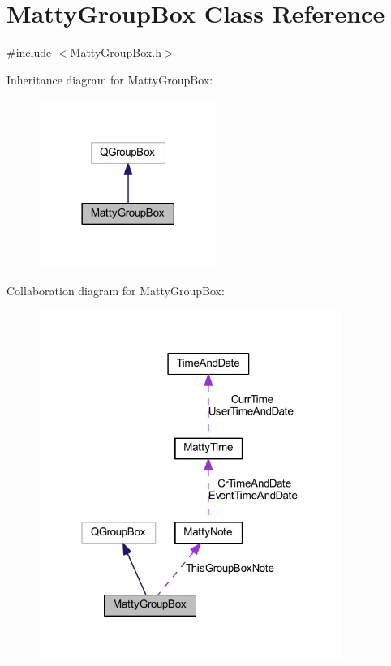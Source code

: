 \hypertarget{classMattyGroupBox}{}\section{Matty\+Group\+Box Class Reference}
\label{classMattyGroupBox}


{\ttfamily \#include $<$Matty\+Group\+Box.\+h$>$}



Inheritance diagram for Matty\+Group\+Box\+:
\nopagebreak
\begin{figure}[H]
\begin{center}
\leavevmode
\includegraphics[width=165pt]{classMattyGroupBox__inherit__graph}
\end{center}
\end{figure}


Collaboration diagram for Matty\+Group\+Box\+:
\nopagebreak
\begin{figure}[H]
\begin{center}
\leavevmode
\includegraphics[width=280pt]{classMattyGroupBox__coll__graph}
\end{center}
\end{figure}
